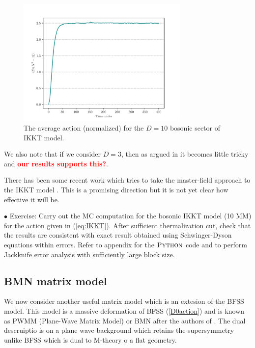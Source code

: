 \documentclass[11pt]{article}
\newcommand{\TODO}[1]{\textcolor{red}{{\bf #1}}}
\begin{document}
\begin{figure}[htbp] 
	\centering 
	\includegraphics[width=0.75\textwidth]{figs/IKKT_plot_S.pdf}
	\caption{\label{fig:IKKT_2}The average action (normalized) for the $D=10$ bosonic sector of IKKT model.}
\end{figure}


We also note that if we consider $D=3$, then as argued in 
\cite{Hotta:1998en} it becomes little tricky and
\TODO{our results supports this?}. 


There has been some recent work which tries to take the master-field approach to the
IKKT model \cite{Klinkhamer:2021wrv}. This is a promising direction 
but it is not yet clear how effective it will be.  


\vspace{10mm} 

\begin{mdframed}[backgroundcolor=blue!3] 
	\textsc{} 
	$\bullet$ Exercise: Carry out the MC computation for the bosonic IKKT model (10 MM) for the action given in (\ref{eq:IKKT}). After sufficient thermalization cut, check that the results are consistent with exact result obtained using Schwinger-Dyson equations within errors. Refer to appendix for the $\textsc{Python}$ code and to perform Jackknife error analysis with sufficiently large block size. 
\end{mdframed} 


\subsection{BMN matrix model}

We now consider another useful matrix model which is an extesion of the BFSS model. This model is a massive deformation of BFSS (\ref{D0action}) and is known as PWMM (Plane-Wave Matrix Model) 
or BMN after the authors of \cite{Berenstein:2002jq}. The dual descruiptio is on a plane wave background which retains the supersymmetry unlike BFSS which is dual to M-theory o a flat geometry.
\end{document}
